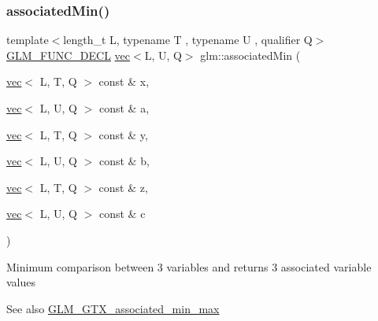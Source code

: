 \subsubsection{\texorpdfstring{associated\+Min()}{associatedMin()}\hspace{0.1cm}{\footnotesize\ttfamily [6/10]}}
{\footnotesize\ttfamily template$<$length\+\_\+t L, typename T , typename U , qualifier Q$>$ \\
\hyperlink{setup_8hpp_ab2d052de21a70539923e9bcbf6e83a51}{G\+L\+M\+\_\+\+F\+U\+N\+C\+\_\+\+D\+E\+CL} \hyperlink{structglm_1_1vec}{vec}$<$L, U, Q$>$ glm\+::associated\+Min (\begin{DoxyParamCaption}\item[{\hyperlink{structglm_1_1vec}{vec}$<$ L, T, Q $>$ const \&}]{x,  }\item[{\hyperlink{structglm_1_1vec}{vec}$<$ L, U, Q $>$ const \&}]{a,  }\item[{\hyperlink{structglm_1_1vec}{vec}$<$ L, T, Q $>$ const \&}]{y,  }\item[{\hyperlink{structglm_1_1vec}{vec}$<$ L, U, Q $>$ const \&}]{b,  }\item[{\hyperlink{structglm_1_1vec}{vec}$<$ L, T, Q $>$ const \&}]{z,  }\item[{\hyperlink{structglm_1_1vec}{vec}$<$ L, U, Q $>$ const \&}]{c }\end{DoxyParamCaption})}

Minimum comparison between 3 variables and returns 3 associated variable values \begin{DoxySeeAlso}{See also}
\hyperlink{group__gtx__associated__min__max}{G\+L\+M\+\_\+\+G\+T\+X\+\_\+associated\+\_\+min\+\_\+max} 
\end{DoxySeeAlso}
\mbox{\label{group__gtx__associated__min__max_ga432224ebe2085eaa2b63a077ecbbbff6}} 
